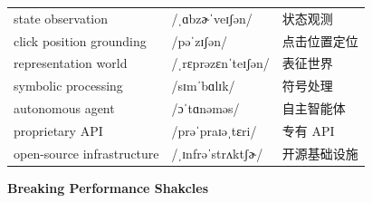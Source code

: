 \documentclass[UTF8,12pt,a4paper]{ctexart}
\providecommand{\zh}[1]{#1}
\begin{document}
\begin{tabular*}{\textwidth}{@{\extracolsep{\fill}}lll@{}}
state observation & {\ipafont /ˌɑbzɚˈveɪʃən/} & \zh{状态观测} \\
click position grounding & {\ipafont /pəˈzɪʃən/} & \zh{点击位置定位} \\
representation world & {\ipafont /ˌrɛprəzɛnˈteɪʃən/} & \zh{表征世界} \\
symbolic processing & {\ipafont /sɪmˈbɑlɪk/} & \zh{符号处理} \\
autonomous agent & {\ipafont /ɔˈtɑnəməs/} & \zh{自主智能体} \\
proprietary API & {\ipafont /prəˈpraɪəˌtɛri/} & \zh{专有 API} \\
open-source infrastructure & {\ipafont /ˌɪnfrəˈstrʌktʃɚ/} & \zh{开源基础设施} \\
\bottomrule
\end{tabular*}

\newpage

\begin{center}
    {\Large \bfseries Breaking Performance Shakcles}
\end{center}
\end{document}
